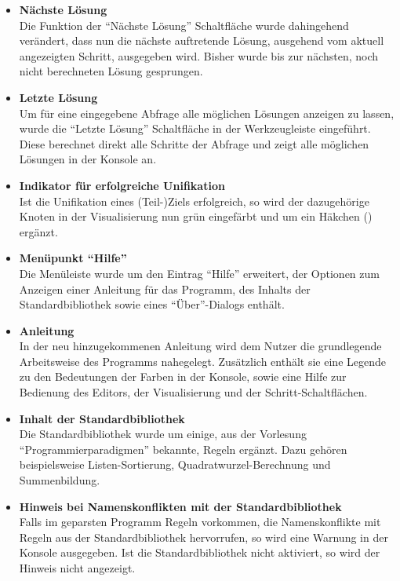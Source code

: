 \documentclass[parskip=full,11pt,twoside]{scrartcl}
\begin{document}
\begin{itemize}
  \item \textbf{Nächste Lösung}\\
        Die Funktion der \enquote{Nächste Lösung} Schaltfläche wurde dahingehend verändert, dass nun die nächste auftretende Lösung, ausgehend vom aktuell angezeigten Schritt, ausgegeben wird. Bisher wurde bis zur nächsten, noch nicht berechneten Lösung gesprungen.
  \item \textbf{Letzte Lösung}\\
        Um für eine eingegebene Abfrage alle möglichen Lösungen anzeigen zu lassen, wurde die \enquote{Letzte Lösung} Schaltfläche in der Werkzeugleiste eingeführt. Diese berechnet direkt alle Schritte der Abfrage und zeigt alle möglichen Lösungen in der Konsole an.
  \item \textbf{Indikator für erfolgreiche Unifikation}\\
        Ist die Unifikation eines (Teil-)Ziels erfolgreich, so wird der dazugehörige Knoten in der Visualisierung nun grün eingefärbt und um ein Häkchen () ergänzt.
  \item \textbf{Menüpunkt \enquote{Hilfe}}\\
        Die Menüleiste wurde um den Eintrag \enquote{Hilfe} erweitert, der Optionen zum Anzeigen einer Anleitung für das Programm, des Inhalts der Standardbibliothek sowie eines \enquote{Über}-Dialogs enthält.
  \item \textbf{Anleitung}\\
        In der neu hinzugekommenen Anleitung wird dem Nutzer die grundlegende Arbeitsweise des Programms nahegelegt. Zusätzlich enthält sie eine Legende zu den Bedeutungen der Farben in der Konsole, sowie eine Hilfe zur Bedienung des Editors, der Visualisierung und der Schritt-Schaltflächen.
  \item \textbf{Inhalt der Standardbibliothek}\\
        Die Standardbibliothek wurde um einige, aus der Vorlesung \enquote{Programmierparadigmen} bekannte, Regeln ergänzt. Dazu gehören beispielsweise Listen-Sortierung, Quadratwurzel-Berechnung und Summenbildung.
  \item \textbf{Hinweis bei Namenskonflikten mit der Standardbibliothek}\\
        Falls im geparsten Programm Regeln vorkommen, die Namenskonflikte mit Regeln aus der Standardbibliothek hervorrufen, so wird eine Warnung in der Konsole ausgegeben. Ist die Standardbibliothek nicht aktiviert, so wird der Hinweis nicht angezeigt.

\end{itemize}
\end{document}

